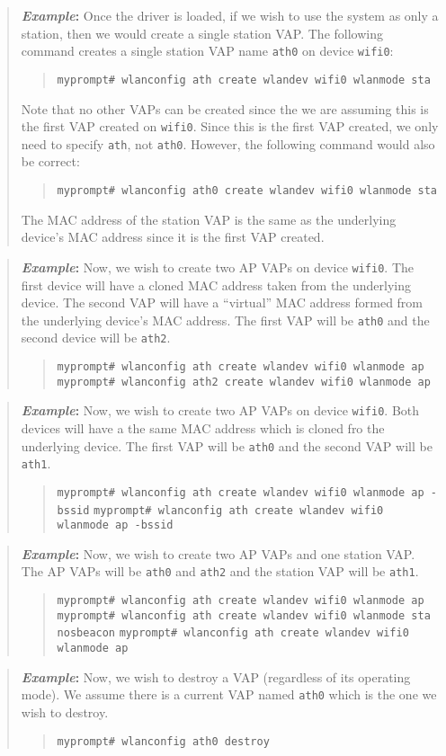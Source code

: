 \documentclass[10pt,fullpage]{article}
\newcommand{\mytt}[1]{{\texttt{#1}}}
\newcommand{\bv}{\begin{verse}}
\newcommand{\ev}{\end{verse}}
\newcommand{\cmd}[1]{{\texttt{myprompt\# #1}}}
\newenvironment{example}{\begin{quote}\textbf{\textit{Example}:}}{\end{quote}}
\begin{document}
\begin{example}
  Once the driver is loaded, if we wish to use the system as only a
  station, then we would create a single station VAP.  The following
  command creates a single station VAP name \mytt{ath0} on device
  \mytt{wifi0}:
  \bv
  \cmd{wlanconfig ath create wlandev wifi0 wlanmode sta}
  \ev
  Note that no other VAPs can be created since the we are assuming
  this is the first VAP created on \mytt{wifi0}.  Since this is the
  first VAP created, we only need to specify \mytt{ath}, not
  \mytt{ath0}.  However, the following command would also be correct:
  \bv
  \cmd{wlanconfig ath0 create wlandev wifi0 wlanmode sta}
  \ev
  The MAC address of the station VAP is the same as the underlying
  device's MAC address since it is the first VAP created.
\end{example}
\begin{example}
  Now, we wish to create two AP VAPs on device \mytt{wifi0}.  The first
  device will have a cloned MAC address taken from the underlying
  device. The second VAP will have a ``virtual'' MAC address formed
  from the underlying device's MAC address.  The first VAP will be
  \mytt{ath0} and the second device will be \mytt{ath2}.
  \bv
  \cmd{wlanconfig ath create wlandev wifi0 wlanmode ap}\\
  \cmd{wlanconfig ath2 create wlandev wifi0 wlanmode ap}
  \ev
\end{example}
\begin{example}
  Now, we wish to create two AP VAPs on device \mytt{wifi0}.  Both
  devices will have a the same MAC address which is cloned fro the
  underlying device.  The first VAP will be \mytt{ath0} and the second
  VAP will be \mytt{ath1}.
  \bv
  \cmd{wlanconfig ath create wlandev wifi0 wlanmode ap -bssid}
  \cmd{wlanconfig ath create wlandev wifi0 wlanmode ap -bssid}
  \ev
\end{example}
\begin{example}
  Now, we wish to create two AP VAPs and one station VAP.  The AP VAPs
  will be \mytt{ath0} and \mytt{ath2} and the station VAP will be
  \mytt{ath1}.
  \bv
  \cmd{wlanconfig ath create wlandev wifi0 wlanmode ap}
  \cmd{wlanconfig ath create wlandev wifi0 wlanmode sta nosbeacon}
  \cmd{wlanconfig ath create wlandev wifi0 wlanmode ap}
  \ev
\end{example}
\begin{example}
  Now, we wish to destroy a VAP (regardless of its operating mode).
  We assume there is a current VAP named \mytt{ath0} which is the one
  we wish to destroy.
  \bv
  \cmd{wlanconfig ath0 destroy}
  \ev
\end{example}
\end{document}
